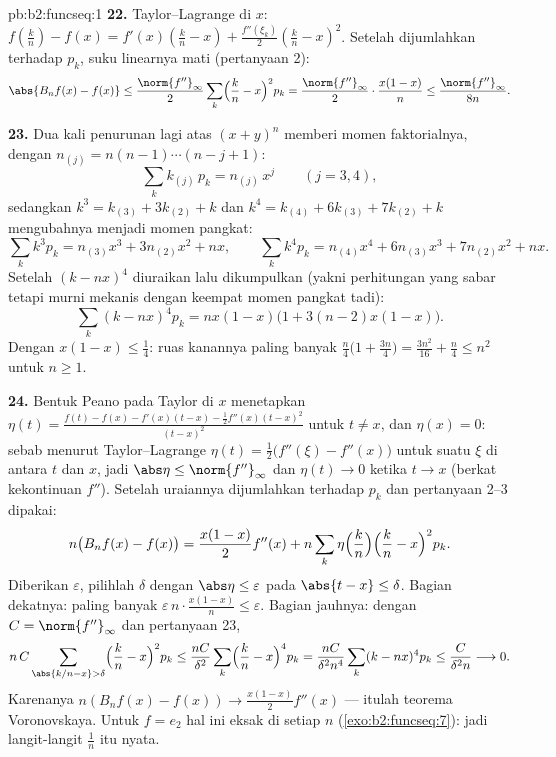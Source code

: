 \begin{solution}{pb:b2:funcseq:1}
\textbf{22.} Taylor--Lagrange di $x$: $f(\frac kn) - f(x) =
f'(x)(\frac kn - x) + \frac{f''(\xi_k)}2(\frac kn - x)^2$.
Setelah dijumlahkan terhadap $p_k$, suku linearnya mati (pertanyaan 2):
\[
\abs{B_nf(x) - f(x)}
\leq \frac{\norm{f''}_\infty}{2}\sum_k\Bigl(\frac kn -
x\Bigr)^2p_k
= \frac{\norm{f''}_\infty}{2}\cdot\frac{x(1-x)}{n}
\leq \frac{\norm{f''}_\infty}{8n} .
\]

\textbf{23.} Dua kali penurunan lagi atas $(x+y)^n$ memberi
momen faktorialnya, dengan $n_{(j)} = n(n-1)\cdots(n-j+1)$:
\[
\sum_k k_{(j)}\,p_k = n_{(j)}\,x^j \qquad (j = 3, 4),
\]
sedangkan $k^3 = k_{(3)} + 3k_{(2)} + k$ dan $k^4 = k_{(4)} + 6k_{(3)} +
7k_{(2)} + k$ mengubahnya menjadi momen pangkat:
\[
\sum_k k^3p_k = n_{(3)}x^3 + 3n_{(2)}x^2 + nx,
\qquad
\sum_k k^4p_k = n_{(4)}x^4 + 6n_{(3)}x^3 + 7n_{(2)}x^2 + nx .
\]
Setelah $(k - nx)^4$ diuraikan lalu dikumpulkan (yakni perhitungan yang
sabar tetapi murni mekanis dengan keempat momen pangkat tadi):
\[
\sum_k(k-nx)^4p_k = nx(1-x)\bigl(1 + 3(n-2)x(1-x)\bigr) .
\]
Dengan $x(1-x) \leq \frac14$: ruas kanannya paling banyak
$\frac n4\bigl(1 + \frac{3n}4\bigr) = \frac{3n^2}{16} +
\frac n4 \leq n^2$ untuk $n \geq 1$.

\textbf{24.} Bentuk Peano pada Taylor di $x$ menetapkan $\eta(t) =
\frac{f(t) - f(x) - f'(x)(t-x) - \frac12f''(x)(t-x)^2}
{(t-x)^2}$ untuk $t \neq x$, dan $\eta(x) = 0$: sebab menurut
Taylor--Lagrange $\eta(t) = \frac12\bigl(f''(\xi) - f''(x)\bigr)$ untuk
suatu $\xi$ di antara $t$ dan $x$, jadi $\abs\eta \leq
\norm{f''}_\infty$ dan $\eta(t) \to 0$ ketika $t \to x$ (berkat
kekontinuan $f''$). Setelah uraiannya dijumlahkan terhadap $p_k$ dan
pertanyaan 2--3 dipakai:
\[
n\bigl(B_nf(x) - f(x)\bigr)
= \frac{x(1-x)}{2}f''(x)
+ n\sum_k\eta\Bigl(\frac kn\Bigr)\Bigl(\frac kn -
x\Bigr)^2p_k .
\]
Diberikan $\varepsilon$, pilihlah $\delta$ dengan $\abs\eta \leq
\varepsilon$ pada $\abs{t - x}\leq\delta$. Bagian dekatnya: paling banyak
$\varepsilon\,n\cdot\frac{x(1-x)}n \leq \varepsilon$. Bagian jauhnya:
dengan $C = \norm{f''}_\infty$ dan pertanyaan 23,
\[
n\,C\sum_{\abs{k/n-x}>\delta}\Bigl(\frac kn -
x\Bigr)^2p_k
\leq \frac{nC}{\delta^2}\sum_k\Bigl(\frac kn -
x\Bigr)^4p_k
= \frac{nC}{\delta^2 n^4}\sum_k(k-nx)^4p_k
\leq \frac{C}{\delta^2 n} \longrightarrow 0 .
\]
Karenanya $n(B_nf(x) - f(x)) \to \frac{x(1-x)}2f''(x)$ ---
itulah teorema Voronovskaya. Untuk $f = e_2$ hal ini eksak di setiap
$n$ (\cref{exo:b2:funcseq:7}): jadi langit-langit $\frac1n$ itu nyata.


\end{solution}

